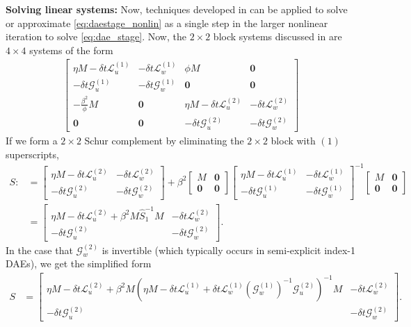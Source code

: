 \documentclass[review]{siamart}
\begin{document}
\textbf{Solving linear systems:}
Now, techniques developed in  can be applied to solve
or approximate \eqref{eq:daestage_nonlin} as a single step in the larger
nonlinear iteration to solve \eqref{eq:dae_stage}. Now, the $2\times 2$
block systems discussed in  are $4\times 4$ systems of
the form
%
\begin{align*}
\begin{bmatrix} \eta M - \delta t\mathcal{L}_{u}^{(1)} & -\delta t\mathcal{L}_{w}^{(1)}
		& \phi M & \mathbf{0} \\
	-\delta t\mathcal{G}_{u}^{(1)} & -\delta t\mathcal{G}_w^{(1)}
		& \mathbf{0} & \mathbf{0} \\
	-\tfrac{\beta^2}{\phi}M & \mathbf{0} & \eta M - \delta t\mathcal{L}_{u}^{(2)} &
		-\delta t\mathcal{L}_{w}^{(2)} \\
	\mathbf{0} & \mathbf{0} & -\delta t\mathcal{G}_{u}^{(2)} &
		-\delta t\mathcal{G}_w^{(2)} \end{bmatrix}
\end{align*}
%
If we form a $2\times 2$ Schur complement by eliminating the $2\times 2$
block with $(1)$ superscripts,
%
\begin{align*}
S :& = \begin{bmatrix} \eta M - \delta t\mathcal{L}_{u}^{(2)} &
	-\delta t\mathcal{L}_{w}^{(2)} \\ -\delta t\mathcal{G}_{u}^{(2)} &
		-\delta t\mathcal{G}_w^{(2)} \end{bmatrix}
	+ \beta^2 \begin{bmatrix} M & \mathbf{0} \\\mathbf{0} & \mathbf{0} \end{bmatrix}
	\begin{bmatrix} \eta M - \delta t\mathcal{L}_{u}^{(1)} &
	-\delta t\mathcal{L}_{w}^{(1)} \\ -\delta t\mathcal{G}_{u}^{(1)} &
		-\delta t\mathcal{G}_w^{(1)} \end{bmatrix}^{-1}
	\begin{bmatrix} M & \mathbf{0} \\\mathbf{0} & \mathbf{0} \end{bmatrix} \\
& = \begin{bmatrix} \eta M - \delta t\mathcal{L}_{u}^{(2)} + \beta^2M \widehat{S}_1^{-1}M &
	-\delta t\mathcal{L}_{w}^{(2)} \\ -\delta t\mathcal{G}_{u}^{(2)} &
		-\delta t\mathcal{G}_w^{(2)} \end{bmatrix}.
\end{align*}
%
In the case that $\mathcal{G}_w^{(2)}$ is invertible (which typically occurs
in semi-explicit index-1 DAEs), we get the simplified form
%
\begin{align*}
S & = \begin{bmatrix} \eta M - \delta t\mathcal{L}_{u}^{(2)} + \beta^2M \left(
	\eta M - \delta t\mathcal{L}_{u}^{(1)} + \delta t\mathcal{L}_{w}^{(1)}
		(\mathcal{G}_w^{(1)})^{-1}\mathcal{G}_{u}^{(2)}\right)^{-1} M &
	-\delta t\mathcal{L}_{w}^{(2)} \\ -\delta t\mathcal{G}_{u}^{(2)} &
		-\delta t\mathcal{G}_w^{(2)} \end{bmatrix}.
\end{align*}
\end{document}
